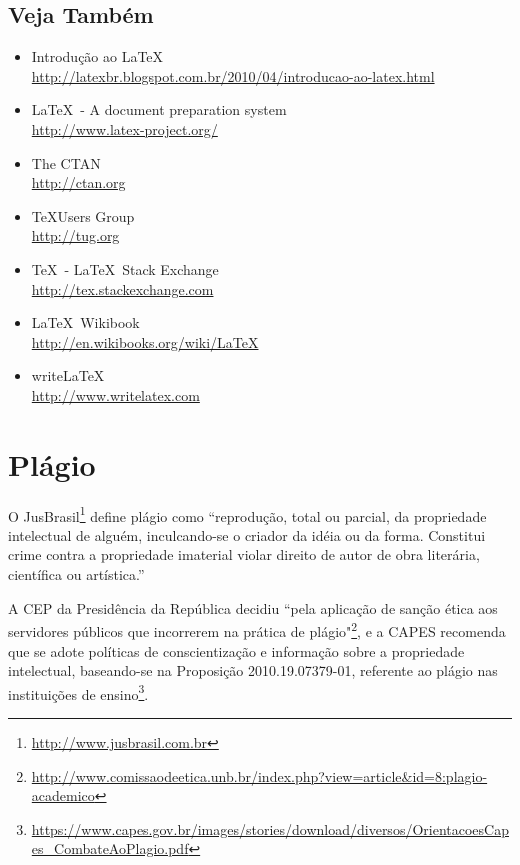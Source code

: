 \subsection{Veja Também}
\begin{itemize}
	\item Introdução ao \LaTeX
		\\\url{http://latexbr.blogspot.com.br/2010/04/introducao-ao-latex.html}
	\item \LaTeX\ - A document preparation system
		\\\url{http://www.latex-project.org/}
	\item The \acrlong{CTAN}
		\\\url{http://ctan.org}
	\item \TeX Users Group
		\\\url{http://tug.org}
	\item \TeX\ - \LaTeX\ Stack Exchange
		\\\url{http://tex.stackexchange.com}
	\item \LaTeX\ Wikibook
		\\\url{http://en.wikibooks.org/wiki/LaTeX}
	\item write\LaTeX
		\\\url{http://www.writelatex.com}
\end{itemize}



\section{Plágio}%
O JusBrasil\footnote{\url{http://www.jusbrasil.com.br}} define plágio como
``reprodução, total ou parcial, da propriedade intelectual de alguém, inculcando-se
o criador da idéia ou da forma. Constitui crime contra a propriedade imaterial
violar direito de autor de obra literária, científica ou artística.''


A \acrfull{CEP} da Presidência da República decidiu  ``pela
aplicação de sanção ética aos servidores públicos que incorrerem na prática de
plágio"\footnote{\url{http://www.comissaodeetica.unb.br/index.php?view=article&id=8:plagio-academico}},
e a \acrfull{CAPES} recomenda que se adote políticas de conscientização e informação
sobre a propriedade intelectual, baseando-se na Proposição 2010.19.07379-01,
referente ao plágio nas instituições de ensino\footnote{\url{https://www.capes.gov.br/images/stories/download/diversos/OrientacoesCapes_CombateAoPlagio.pdf}}.


